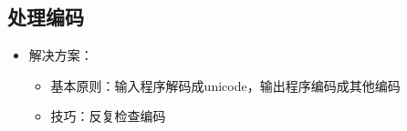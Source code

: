 \documentclass{beamer}
\begin{document}
\subsection{处理编码}
\begin{itemize}
  \item 解决方案：
  \begin{itemize}
    \item 基本原则：输入程序解码成unicode，输出程序编码成其他编码
    \item 技巧：反复检查编码 
  \end{itemize}
\end{itemize}

% 
% 
\end{document}
